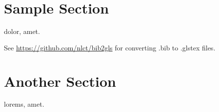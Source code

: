\documentclass{article}
\begin{document}
\section{Sample Section}

\gls{dolor}, \gls{amet}.

See \url{https://github.com/nlct/bib2gls} for converting
.bib to .glstex files.

\section{Another Section}

\glspl{lorem}, \gls{amet}.

\printunsrtglossary
\end{document}
